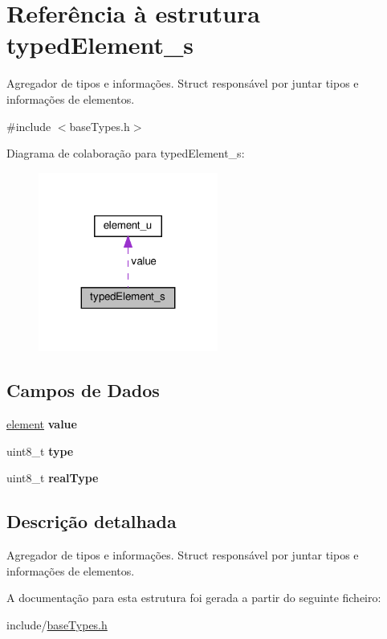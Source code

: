 \hypertarget{structtypedElement__s}{}\section{Referência à estrutura typed\+Element\+\_\+s}
\label{structtypedElement__s}


Agregador de tipos e informações. Struct responsável por juntar tipos e informações de elementos.  




{\ttfamily \#include $<$base\+Types.\+h$>$}



Diagrama de colaboração para typed\+Element\+\_\+s\+:\nopagebreak
\begin{figure}[H]
\begin{center}
\leavevmode
\includegraphics[width=167pt]{structtypedElement__s__coll__graph}
\end{center}
\end{figure}
\subsection*{Campos de Dados}
\begin{DoxyCompactItemize}
\item 
\mbox{\label{structtypedElement__s_a579b7dd61dd13e2a1d37035d3758a2dc}} 
\hyperlink{unionelement__u}{element} {\bfseries value}
\item 
\mbox{\label{structtypedElement__s_a725ddec1b2a04b6488cdde81f3e0255e}} 
uint8\+\_\+t {\bfseries type}
\item 
\mbox{\label{structtypedElement__s_a265d7ad822f91bfa8fd6eb292e2d20d8}} 
uint8\+\_\+t {\bfseries real\+Type}
\end{DoxyCompactItemize}


\subsection{Descrição detalhada}
Agregador de tipos e informações. Struct responsável por juntar tipos e informações de elementos. 

A documentação para esta estrutura foi gerada a partir do seguinte ficheiro\+:\begin{DoxyCompactItemize}
\item 
include/\hyperlink{baseTypes_8h}{base\+Types.\+h}\end{DoxyCompactItemize}
